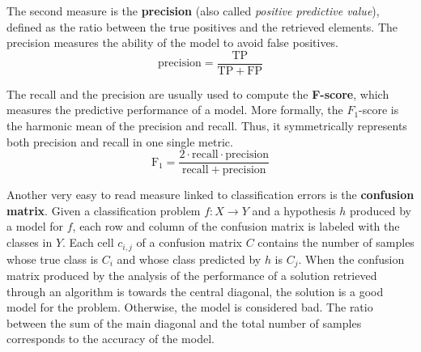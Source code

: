 \documentclass[a4paper, 12pt]{report}
\begin{document}
    The second measure is the \textbf{precision} (also called \textit{positive predictive value}), defined as the ratio between the true positives and the retrieved elements. The precision measures the ability of the model to avoid false positives.
    \[\mathrm{precision} = \frac{\mathrm{TP}}{\mathrm{TP} + \mathrm{FP}}\]

    The recall and the precision are usually used to compute the \textbf{F-score}, which  measures the predictive performance of a model. More formally, the $F_1$-score is the harmonic mean of the precision and recall. Thus, it symmetrically represents both precision and recall in one single metric.
    \[\mathrm{F_1} = \frac{2 \cdot \mathrm{recall} \cdot \mathrm{precision}}{\mathrm{recall} + \mathrm{precision}}\]

    Another very easy to read measure linked to classification errors is the \textbf{confusion matrix}. Given a classification problem $f : X \to Y$ and a hypothesis $h$ produced by a model for $f$, each row and column of the confusion matrix is labeled with the classes in $Y$. Each cell $c_{i,j}$ of a confusion matrix $C$ contains the number of samples whose true class is $C_i$ and whose class predicted by $h$ is $C_j$. When the confusion matrix produced by the analysis of the performance of a solution retrieved through an algorithm is  towards the central diagonal, the solution is a good model for the problem. Otherwise, the model is considered bad. The ratio between the sum of the main diagonal and the total number of samples corresponds to the accuracy of the model.
\end{document}
